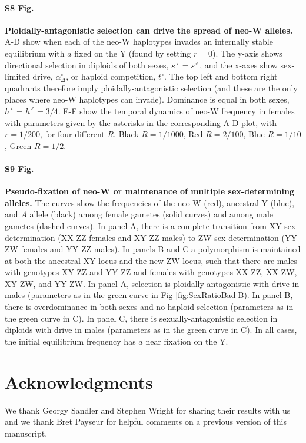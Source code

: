 \documentclass[10pt,letterpaper]{article}
\begin{document}
\paragraph*{S8 Fig.}
\label{fig:regionPloidAntag}
{\bf Ploidally-antagonistic selection can drive the spread of neo-W alleles. }
A-D show when each of the neo-W haplotypes invades an internally stable equilibrium with $a$ fixed on the Y (found by setting $r=0$).
The y-axis shows directional selection in diploids of both sexes, $s^\female=s^\male$, and the x-axes show sex-limited drive, $\alpha_\Delta^\circ$, or haploid competition, $t^\circ$.
The top left and bottom right quadrants therefore imply ploidally-antagonistic selection (and these are the only places where neo-W haplotypes can invade).
Dominance is equal in both sexes, $h^\female=h^\male=3/4$. 
E-F show the temporal dynamics of neo-W frequency in females with parameters given by the asterisks in the corresponding A-D plot, with $r=1/200$, for four different $R$.
Black $R=1/1000$, Red $R=2/100$, Blue $R=1/10$, Green $R=1/2$.  

\paragraph*{S9 Fig.}
\label{fig:freqAll}
{\bf Pseudo-fixation of neo-W or maintenance of multiple sex-determining alleles. }
The curves show the frequencies of the neo-W (red), ancestral Y (blue), and $A$ allele (black) among female gametes (solid curves) and among male gametes (dashed curves). 
In panel A, there is a complete transition from XY sex determination (XX-ZZ females and XY-ZZ males) to ZW sex determination (YY-ZW females and YY-ZZ males).  
In panels B and C a polymorphism is maintained at both the ancestral XY locus and the new ZW locus, such that there are males with genotypes XY-ZZ and YY-ZZ and females with genotypes XX-ZZ, XX-ZW, XY-ZW, and YY-ZW. 
In panel A, selection is ploidally-antagonistic with drive in males (parameters as in the green curve in Fig \ref{fig:SexRatioBad}B).
In panel B, there is overdominance in both sexes and no haploid selection (parameters as in the green curve in C).
In panel C, there is sexually-antagonistic selection in diploids with drive in males (parameters as in the green curve in C).
In all cases, the initial equilibrium frequency has $a$ near fixation on the Y.

\section*{Acknowledgments}
We thank Georgy Sandler and Stephen Wright for sharing their results with us and we thank Bret Payseur for helpful comments on a previous version of this manuscript. 
\end{document}
